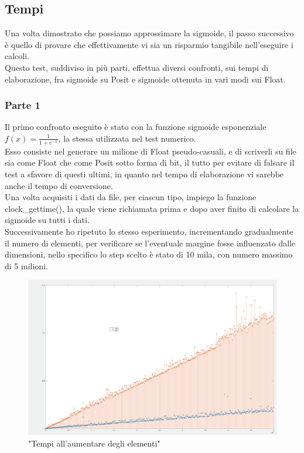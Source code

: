 \documentclass[a4paper,11pt]{article}
\begin{document}
\subsection{Tempi}

Una volta dimostrato che possiamo approssimare la sigmoide, il passo successivo è quello di provare che effettivamente vi sia un risparmio tangibile nell'eseguire i calcoli. \\
Questo test, suddiviso in più parti, effettua diversi confronti, sui tempi di elaborazione, fra sigmoide su Posit e sigmoide ottenuta in vari modi sui Float.

\subsubsection{Parte 1}

Il primo confronto eseguito è stato con la funzione sigmoide esponenziale  $ f(x) = \frac {1}{1 + e^{-x}} $, la stessa utilizzata nel test numerico.\\
Esso consiste nel generare un milione di Float pseudo-casuali, e di scriverli su file sia come Float che come Posit sotto forma di bit, il tutto per evitare di falsare il test a sfavore di questi ultimi, in quanto nel tempo di elaborazione vi sarebbe anche il tempo di conversione. \\
Una volta acquisiti i dati da file, per ciascun tipo, impiego la funzione clock\_gettime(), la quale viene richiamata prima e dopo aver finito di calcolare la sigmoide su tutti i dati.\\
Successivamente ho ripetuto lo stesso esperimento, incrementando gradualmente il numero di elementi, per verificare se l'eventuale margine fosse influenzato dalle dimensioni, nello specifico lo step scelto è stato di 10 mila, con numero massimo di 5 milioni.

\begin{figure}[h]
	\includegraphics[scale=0.15]{tempi}
	\centering
	\caption{"Tempi all'aumentare degli elementi"}
\end{figure}
\end{document}
